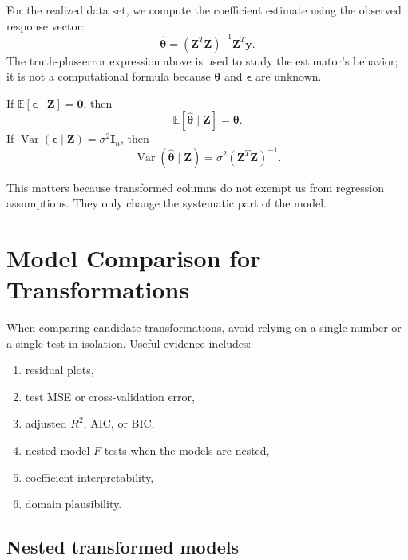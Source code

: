 For the realized data set, we compute the coefficient estimate using the observed response vector:
\begin{equation}
  \widehat{\boldsymbol{\theta}}
  =(\mathbf{Z}^T\mathbf{Z})^{-1}\mathbf{Z}^T\mathbf{y}.
\end{equation}
The truth-plus-error expression above is used to study the estimator's behavior; it is not a computational formula because \(\boldsymbol{\theta}\) and \(\boldsymbol{\epsilon}\) are unknown.

If \(\mathbb{E}[\boldsymbol{\epsilon}\mid\mathbf{Z}]=\mathbf{0}\), then
\begin{equation}
  \mathbb{E}[\widehat{\boldsymbol{\theta}}\mid\mathbf{Z}]=\boldsymbol{\theta}.
\end{equation}
If \(\operatorname{Var}(\boldsymbol{\epsilon}\mid\mathbf{Z})=\sigma^2\mathbf{I}_n\), then
\begin{equation}
  \operatorname{Var}(\widehat{\boldsymbol{\theta}}\mid\mathbf{Z})
  =\sigma^2(\mathbf{Z}^T\mathbf{Z})^{-1}.
\end{equation}

This matters because transformed columns do not exempt us from regression assumptions.  They only change the systematic part of the model.

\section{Model Comparison for Transformations}

When comparing candidate transformations, avoid relying on a single number or a single test in isolation.  Useful evidence includes:
\begin{enumerate}
  \item residual plots,
  \item test MSE or cross-validation error,
  \item adjusted \(R^2\), AIC, or BIC,
  \item nested-model \(F\)-tests when the models are nested,
  \item coefficient interpretability,
  \item domain plausibility.
\end{enumerate}

\subsection*{Nested transformed models}

